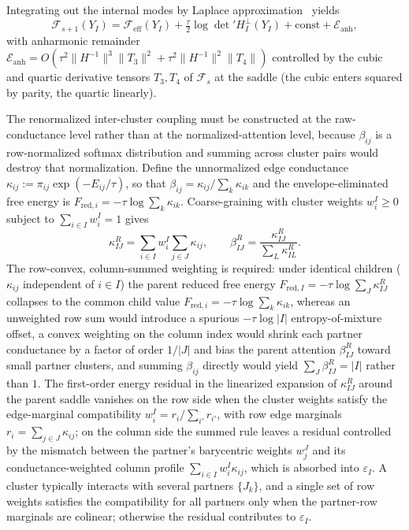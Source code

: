 \documentclass[11pt]{article}
\begin{document}
Integrating out the internal modes by Laplace approximation~\cite{Cardy1996} yields
\begin{equation}
\mathcal{F}_{s+1}(Y_I) = \mathcal{F}_{\mathrm{eff}}(Y_I) + \tfrac{\tau}{2}\log\det{}'H_I^\perp(Y_I) + \mathrm{const} + \mathcal{E}_{\mathrm{anh}},
\label{eq:rg_laplace}
\end{equation}
with anharmonic remainder $\mathcal{E}_{\mathrm{anh}} = O(\tau^2 \|H^{-1}\|^3 \|T_3\|^2 + \tau^2 \|H^{-1}\|^2 \|T_4\|)$ controlled by the cubic and quartic derivative tensors $T_3, T_4$ of $\mathcal{F}_s$ at the saddle (the cubic enters squared by parity, the quartic linearly).

The renormalized inter-cluster coupling must be constructed at the raw-conductance level rather than at the normalized-attention level, because $\beta_{ij}$ is a row-normalized softmax distribution and summing across cluster pairs would destroy that normalization. Define the unnormalized edge conductance $\kappa_{ij} := \pi_{ij}\exp(-E_{ij}/\tau)$, so that $\beta_{ij} = \kappa_{ij}/\sum_k \kappa_{ik}$ and the envelope-eliminated free energy is $F_{\mathrm{red},i} = -\tau \log \sum_k \kappa_{ik}$. Coarse-graining with cluster weights $w_i^I \ge 0$ subject to $\sum_{i \in I} w_i^I = 1$ gives
\begin{equation}
\kappa_{IJ}^R = \sum_{i \in I} w_i^I \sum_{j \in J} \kappa_{ij}, \qquad \beta_{IJ}^R = \frac{\kappa_{IJ}^R}{\sum_L \kappa_{IL}^R}.
\label{eq:rg_inter_cluster}
\end{equation}
The row-convex, column-summed weighting is required: under identical children ($\kappa_{ij}$ independent of $i \in I$) the parent reduced free energy $F_{\mathrm{red},I} = -\tau \log \sum_J \kappa_{IJ}^R$ collapses to the common child value $F_{\mathrm{red},i} = -\tau \log \sum_k \kappa_{ik}$, whereas an unweighted row sum would introduce a spurious $-\tau \log |I|$ entropy-of-mixture offset, a convex weighting on the column index would shrink each partner conductance by a factor of order $1/|J|$ and bias the parent attention $\beta_{IJ}^R$ toward small partner clusters, and summing $\beta_{ij}$ directly would yield $\sum_J \beta_{IJ}^R = |I|$ rather than $1$. The first-order energy residual in the linearized expansion of $\kappa_{IJ}^R$ around the parent saddle vanishes on the row side when the cluster weights satisfy the edge-marginal compatibility $w_i^I = r_i/\sum_{i'} r_{i'}$, with row edge marginals $r_i = \sum_{j \in J} \kappa_{ij}$; on the column side the summed rule leaves a residual controlled by the mismatch between the partner's barycentric weights $w_j^J$ and its conductance-weighted column profile $\sum_{i \in I} w_i^I \kappa_{ij}$, which is absorbed into $\varepsilon_I$. A cluster typically interacts with several partners $\{J_k\}$, and a single set of row weights satisfies the compatibility for all partners only when the partner-row marginals are colinear; otherwise the residual contributes to $\varepsilon_I$.
\end{document}
